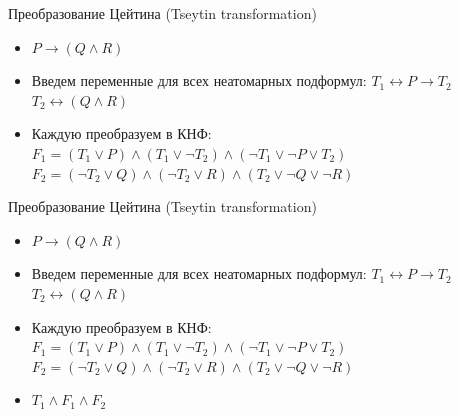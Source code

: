 \documentclass{beamer}
\begin{document}
\begin{frame}{Преобразование Цейтина (Tseytin transformation)}
\begin{itemize}
\item $P \rightarrow (Q \wedge R)$
\item Введем переменные для всех неатомарных подформул:\newline
$T_1 \leftrightarrow P \rightarrow T_2$\newline
$T_2 \leftrightarrow (Q \wedge R)$\newline
\item Каждую преобразуем в КНФ:\newline
$F_1 = (T_1 \vee P) \wedge (T_1 \vee \lnot T_2) \wedge (\lnot T_1 \vee \lnot P \vee T_2)$\newline
$F_2 = (\lnot T_2 \vee Q) \wedge (\lnot T_2 \vee R) \wedge (T_2 \vee \lnot Q \vee \lnot R)$\newline
\end{itemize}
\end{frame}

\begin{frame}{Преобразование Цейтина (Tseytin transformation)}
\begin{itemize}
\item $P \rightarrow (Q \wedge R)$
\item Введем переменные для всех неатомарных подформул:\newline
$T_1 \leftrightarrow P \rightarrow T_2$\newline
$T_2 \leftrightarrow (Q \wedge R)$\newline
\item Каждую преобразуем в КНФ:\newline
$F_1 = (T_1 \vee P) \wedge (T_1 \vee \lnot T_2) \wedge (\lnot T_1 \vee \lnot P \vee T_2)$\newline
$F_2 = (\lnot T_2 \vee Q) \wedge (\lnot T_2 \vee R) \wedge (T_2 \vee \lnot Q \vee \lnot R)$\newline
\item $T_1 \wedge F_1 \wedge F_2$
\end{itemize}
\end{frame}
\end{document}
